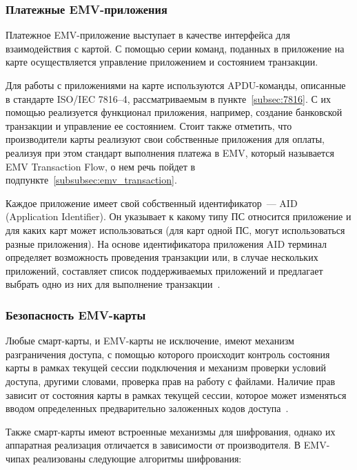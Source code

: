 \subsubsection{Платежные EMV-приложения}

Платежное EMV-приложение выступает в качестве интерфейса для взаимодействия с картой.
С помощью серии команд, поданных в приложение на карте осуществляется управление приложением и состоянием транзакции.

Для работы с приложениями на карте используются APDU-команды, описанные в стандарте ISO/IEC 7816--4, рассматриваемым в пункте~\ref{subsec:7816}.
С их помощью реализуется функционал приложения, например, создание банковской транзакции и управление ее состоянием.
Стоит также отметить, что производители карты реализуют свои собственные приложения для оплаты, реализуя при этом стандарт выполнения платежа в EMV, который называется EMV Transaction Flow, о нем речь пойдет в подпункте~\ref{subsubsec:emv_transaction}.

Каждое приложение имеет свой собственный идентификатор~--- AID (Application Identifier).
Он указывает к какому типу ПС относится приложение и для каких карт может использоваться (для карт одной ПС, могут использоваться разные приложения).
На основе идентификатора приложения AID терминал определяет возможность проведения транзакции или, в случае нескольких приложений, составляет список поддерживаемых приложений и предлагает выбрать одно из них для выполнение транзакции~\cite{emv_card_mechanism}.

\subsubsection{Безопасность EMV-карты}

Любые смарт-карты, и EMV-карты не исключение, имеют механизм разграничения доступа, с помощью которого происходит контроль состояния карты в рамках текущей сессии подключения и механизм проверки условий доступа, другими словами, проверка прав на работу с файлами.
Наличие прав зависит от состояния карты в рамках текущей сессии, которое может изменяться вводом определенных предварительно заложенных кодов доступа~\cite{habr_smart_card_for_little}.

Также смарт-карты имеют встроенные механизмы для шифрования, однако их аппаратная реализация отличается в зависимости от производителя.
В EMV-чипах реализованы следующие алгоритмы шифрования:

